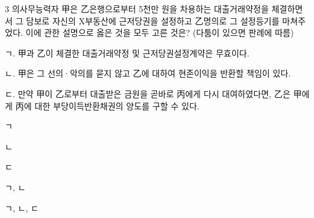 \begin{question}{3}
의사무능력자 甲은 乙은행으로부터 5천만 원을 차용하는 대출거래약정을 체결하면서 그 담보로 자신의 X부동산에 근저당권을 설정하고 乙명의로 그 설정등기를 마쳐주었다. 이에 관한 설명으로 옳은 것을 모두 고른 것은? (다툼이 있으면 판례에 따름)
\begin{framedtext}
ㄱ. 甲과 乙이 체결한 대출거래약정 및 근저당권설정계약은 무효이다. \par
ㄴ. 甲은 그 선의·악의를 묻지 않고 乙에 대하여 현존이익을 반환할 책임이 있다. \par
ㄷ. 만약 甲이 乙로부터 대출받은 금원을 곧바로 丙에게 다시 대여하였다면, 乙은 甲에게 丙에 대한 부당이득반환채권의 양도를 구할 수 있다. \par
\end{framedtext}
\begin{choices}
  \item ㄱ
  \item ㄴ
  \item ㄷ
  \item ㄱ, ㄴ
  \item ㄱ, ㄴ, ㄷ
\end{choices}
\end{question}

